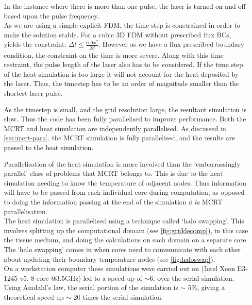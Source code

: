 In the instance where there is more than one pulse, the laser is turned on and off based upon the pulse frequency.\\

As we are using a simple explicit FDM, the time step is constrained in order to make the solution stable. For a cubic 3D FDM without prescribed flux BCs, yields the constraint: $\Delta t \leq \tfrac{\alpha \Delta x^2}{2\beta}$. However as we have a flux prescribed boundary condition, the constraint on the time is more severe. Along with this time restraint, the pulse length of the laser also has to be considered. If the time step of the heat simulation is too large it will not account for the heat deposited by the laser. Thus, the timestep has to be an order of magnitude smaller than the shortest laser pulse.

As the timestep is small, and the grid resolution large, the resultant simulation is slow. Thus the code has been fully parallelised to improve performance. Both the MCRT and heat simulation are independently parallelised. As discussed in \cref{sec:mcrt-para}, the MCRT simulation is fully parallelised, and the results are passed to the heat simulation.

Parallelisation of the heat simulation is more involved than the `embarrassingly parallel' class of problems that MCRT belongs to. This is due to the heat simulation needing to know the temperature of adjacent nodes. Thus information will have to be passed from each individual core during computation, as opposed to doing the information passing at the end of the simulation \textit{\`a la} MCRT parallelisation.\\
The heat simulation is parallelised using a technique called `halo swapping'. This involves splitting up the computational domain (see \cref{fig:griddecomp}), in this case the tissue medium, and doing the calculations on each domain on a separate core. The `halo swapping' comes in when cores need to communicate with each other about updating their boundary temperature nodes (see \cref{fig:haloswap}).\\

On a workstation computer these simulations were carried out on (Intel Xeon E3-1245 v5, 8 core @3.5GHz) led to a speed up of $\sim$6, over the serial simulation. Using Amdahl's law\cite{amdahl1967validity}, the serial portion of the simulation is $\sim$ 5\%, giving a theoretical speed up $\sim$ 20 times the serial simulation.


